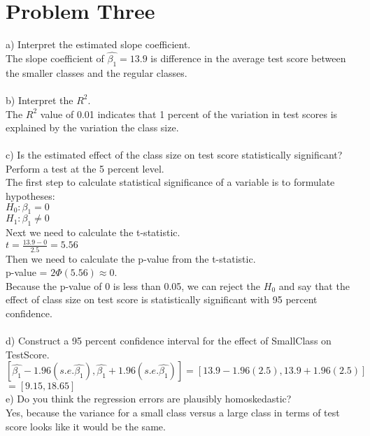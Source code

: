\documentclass[11pt, oneside]{article}   	%
\begin{document}
\section{Problem Three}
a) Interpret the estimated slope coefficient.\\
The slope coefficient of $\hat{\beta_1} = 13.9$ is difference in the average test score between the smaller classes and the regular classes.\\~\\
b) Interpret the $R^2$.\\
The $R^2$ value of 0.01 indicates that 1 percent of the variation in test scores is explained by the variation the class size. \\~\\
c) Is the estimated effect of the class size on test score statistically significant? Perform a test at the 5 percent level.\\
The first step to calculate statistical significance of a variable is to formulate hypotheses:\\
$H_0: \beta_1 = 0$\\
$H_1: \beta_1 \neq 0$\\
Next we need to calculate the t-statistic.\\
$t = \frac{13.9 - 0}{2.5} = 5.56$\\
Then we need to calculate the p-value from the t-statistic.\\
p-value = $2\Phi(5.56) \approx 0$.\\
Because the p-value of 0 is less than 0.05, we can reject the $H_0$ and say that the effect of class size on test score is statistically significant with 95 percent confidence.\\~\\
d) Construct a 95 percent confidence interval for the effect of SmallClass on TestScore.\\
$[\hat{\beta_1} - 1.96(s.e. \hat{\beta_1}), \hat{\beta_1} + 1.96(s.e. \hat{\beta_1})] = [13.9 - 1.96(2.5), 13.9+1.96(2.5)]$\\
$ = [9.15, 18.65]$\\
e) Do you think the regression errors are plausibly homoskedastic?\\
Yes, because the variance for a small class versus a large class in terms of test score looks like it would be the same.
\end{document}
